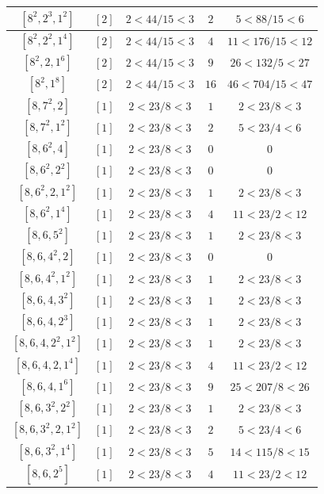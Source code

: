 \documentclass{article}%
\begin{document}
\begin{center}
\begin{longtable}{||c|c|c|c|c||}
$[8^{2}, 2^{3}, 1^{2}]$ & $[2]$ & $2 < 44/15 < 3$ & $2$ & $5 < 88/15 < 6$ \\ \hline 
$[8^{2}, 2^{2}, 1^{4}]$ & $[2]$ & $2 < 44/15 < 3$ & $4$ & $11 < 176/15 < 12$ \\ \hline 
$[8^{2}, 2, 1^{6}]$ & $[2]$ & $2 < 44/15 < 3$ & $9$ & $26 < 132/5 < 27$ \\ \hline 
$[8^{2}, 1^{8}]$ & $[2]$ & $2 < 44/15 < 3$ & $16$ & $46 < 704/15 < 47$ \\ \hline 
$[8, 7^{2}, 2]$ & $[1]$ & $2 < 23/8 < 3$ & $1$ & $2 < 23/8 < 3$ \\ \hline 
$[8, 7^{2}, 1^{2}]$ & $[1]$ & $2 < 23/8 < 3$ & $2$ & $5 < 23/4 < 6$ \\ \hline 
$[8, 6^{2}, 4]$ & $[1]$ & $2 < 23/8 < 3$ & $0$ & $0$ \\ \hline 
$[8, 6^{2}, 2^{2}]$ & $[1]$ & $2 < 23/8 < 3$ & $0$ & $0$ \\ \hline 
$[8, 6^{2}, 2, 1^{2}]$ & $[1]$ & $2 < 23/8 < 3$ & $1$ & $2 < 23/8 < 3$ \\ \hline 
$[8, 6^{2}, 1^{4}]$ & $[1]$ & $2 < 23/8 < 3$ & $4$ & $11 < 23/2 < 12$ \\ \hline 
$[8, 6, 5^{2}]$ & $[1]$ & $2 < 23/8 < 3$ & $1$ & $2 < 23/8 < 3$ \\ \hline 
$[8, 6, 4^{2}, 2]$ & $[1]$ & $2 < 23/8 < 3$ & $0$ & $0$ \\ \hline 
$[8, 6, 4^{2}, 1^{2}]$ & $[1]$ & $2 < 23/8 < 3$ & $1$ & $2 < 23/8 < 3$ \\ \hline 
$[8, 6, 4, 3^{2}]$ & $[1]$ & $2 < 23/8 < 3$ & $1$ & $2 < 23/8 < 3$ \\ \hline 
$[8, 6, 4, 2^{3}]$ & $[1]$ & $2 < 23/8 < 3$ & $1$ & $2 < 23/8 < 3$ \\ \hline 
$[8, 6, 4, 2^{2}, 1^{2}]$ & $[1]$ & $2 < 23/8 < 3$ & $1$ & $2 < 23/8 < 3$ \\ \hline 
$[8, 6, 4, 2, 1^{4}]$ & $[1]$ & $2 < 23/8 < 3$ & $4$ & $11 < 23/2 < 12$ \\ \hline 
$[8, 6, 4, 1^{6}]$ & $[1]$ & $2 < 23/8 < 3$ & $9$ & $25 < 207/8 < 26$ \\ \hline 
$[8, 6, 3^{2}, 2^{2}]$ & $[1]$ & $2 < 23/8 < 3$ & $1$ & $2 < 23/8 < 3$ \\ \hline 
$[8, 6, 3^{2}, 2, 1^{2}]$ & $[1]$ & $2 < 23/8 < 3$ & $2$ & $5 < 23/4 < 6$ \\ \hline 
$[8, 6, 3^{2}, 1^{4}]$ & $[1]$ & $2 < 23/8 < 3$ & $5$ & $14 < 115/8 < 15$ \\ \hline 
$[8, 6, 2^{5}]$ & $[1]$ & $2 < 23/8 < 3$ & $4$ & $11 < 23/2 < 12$ \\ \hline 

\end{longtable}
\end{center}
\end{document}
